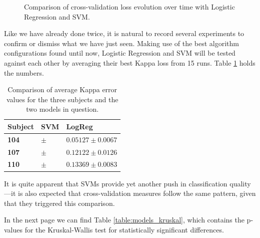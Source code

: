 \begin{figure}[bth]
\begin{center}
		\end{center}
		\caption[Cross-validation loss comparison with Logistic Regression and \acs{SVM}]{Comparison of cross-validation loss evolution over time with Logistic Regression and \acs{SVM}.}\label{gfx:fs_models_cv}

	\end{figure}

	Like we have already done twice, it is natural to record several experiments to confirm or dismiss what we have just seen. Making use of the best algorithm configurations found until now, Logistic Regression and \acs{SVM} will be tested against each other by averaging their best Kappa loss from 15 runs. Table \ref{table:models_kappa} holds the numbers.

	\vspace{0.3cm}

	\begin{table}[h]

        \centering
        \setlength\arrayrulewidth{0.8pt}

        \begin{tabular}{| >{\centering\arraybackslash}m{0.5in} | >{\centering\arraybackslash}m{1.1in} | >{\centering\arraybackslash}m{1.1in} |}

            \hline
            \rowcolor{RoyalBlue}
            \textbf{Subject} & \textbf{SVM} & \textbf{LogReg} \\
            \hline
            \textbf{104} & $ \pm $ & $0.05127 \pm 0.0067$ \\
            \hline
            \textbf{107} & $ \pm $ & $0.12122 \pm 0.0126$ \\
            \hline
            \textbf{110} & $ \pm $ & $0.13369 \pm 0.0083$ \\
            \hline

        \end{tabular}

        \caption{Comparison of average Kappa error values for the three subjects and the two models in question.}\label{table:models_kappa}

    \end{table}

    It is quite apparent that \acs{SVM}s provide yet another push in classification quality---it is also expected that cross-validation measures follow the same pattern, given that they triggered this comparison.

    In the next page we can find Table \ref{table:models_kruskal}, which contains the p-values for the Kruskal-Wallis test for statistically significant differences.

